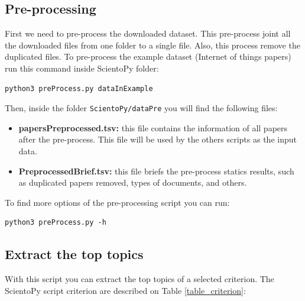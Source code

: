 \documentclass[10pt,letterpaper]{article}
\begin{document}
\subsection{Pre-processing}

First we need to pre-process the downloaded dataset. This pre-process joint all the downloaded files from one folder to a single file. Also, this process remove the duplicated files. To pre-process the example dataset (Internet of things papers) run this command inside ScientoPy folder: 
\begin{verbatim}
python3 preProcess.py dataInExample
\end{verbatim}

Then, inside the folder \verb|ScientoPy/dataPre| you will find the following files: 
\begin{itemize}
\item \textbf{papersPreprocessed.tsv:} this file contains the information of all papers after the pre-process. This file will be used by the others scripts as the input data. 
\item \textbf{PreprocessedBrief.tsv:} this file briefs the pre-process statics results, such as duplicated papers removed, types of documents, and others. 
\end{itemize}

To find more options of the pre-processing script you can run:
\begin{verbatim}
python3 preProcess.py -h
\end{verbatim}

\subsection{Extract the top topics}

With this script you can extract the top topics of a selected criterion. The ScientoPy script criterion are described on Table \ref{table_criterion}:
\end{document}
